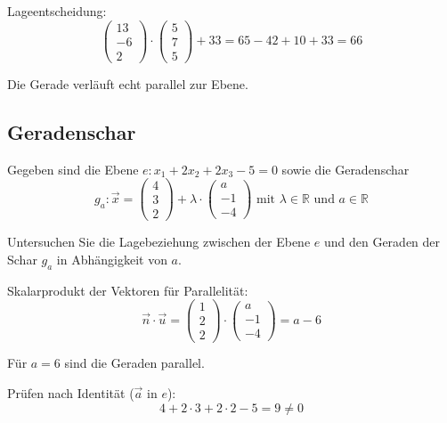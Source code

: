 \documentclass{ajc}
\numberwithin{equation}{subsection}
\begin{document}
	Lageentscheidung:
	\begin{equation}
		\left(\begin{array}{r} 13 \\ -6 \\ 2\end{array}\right) \cdot \left(\begin{array}{r} 5 \\ 7 \\ 5\end{array}\right) + 33 = 65 - 42 + 10 + 33 = 66
	\end{equation}
	
	Die Gerade verläuft echt parallel zur Ebene.
	
	\subsection{Geradenschar}
	Gegeben sind die Ebene $e: x_1 + 2x_2 + 2x_3 - 5 = 0$ sowie die Geradenschar
	\begin{equation}
		g_a: \vec{x} = \left(\begin{array}{r} 4 \\ 3 \\ 2\end{array}\right) + \lambda \cdot \left(\begin{array}{r} a \\ -1 \\ -4\end{array}\right) \text{ mit } \lambda \in \mathbb{R} \text{ und } a \in \mathbb{R}
	\end{equation}
	
	Untersuchen Sie die Lagebeziehung zwischen der Ebene $e$ und den Geraden der Schar $g_a$ in Abhängigkeit von $a$.
	
	Skalarprodukt der Vektoren für Parallelität:
	\begin{equation}
		\vec{n}\cdot\vec{u} = \left(\begin{array}{r} 1 \\ 2 \\ 2\end{array}\right) \cdot \left(\begin{array}{r} a \\ -1 \\ -4\end{array}\right) = a -6
	\end{equation}
	
	Für $a = 6$ sind die Geraden parallel.
	
	Prüfen nach Identität ($\vec{a}$ in $e$):
	\begin{equation}
		4 + 2 \cdot 3 + 2 \cdot 2 - 5 = 9 \neq 0
	\end{equation}
	
\end{document}
